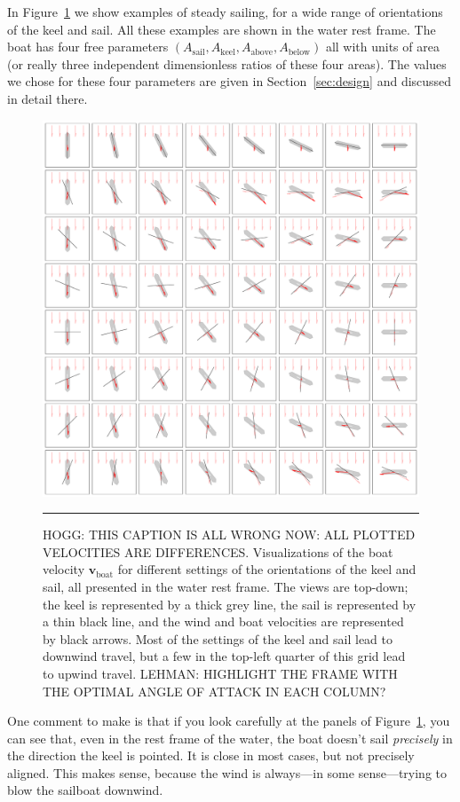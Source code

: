 \documentclass[letterpaper]{article}
\renewcommand{\vec}[1]{\boldsymbol{#1}}
\newcommand{\boat}{\text{boat}}
\newcommand{\sail}{\text{sail}}
\newcommand{\keel}{\text{keel}}
\renewcommand{\above}{\text{above}}
\newcommand{\below}{\text{below}}
\newcommand{\vboat}{\vec{v}_\boat}
\newcommand{\secref}[1]{Section~\ref{#1}}
\newcommand{\figref}[1]{Figure~\ref{#1}}
\newcommand{\figurerule}{\rule[1ex]{\textwidth}{0.2pt}}
\begin{document}
In \figref{fig:steady} we show examples of steady sailing, for a wide range of orientations of the keel and sail.
All these examples are shown in the water rest frame.
The boat has four free parameters $(A_\sail,A_\keel,A_{\above},A_{\below})$ all with units of area (or really three independent dimensionless ratios of these four areas).
The values we chose for these four parameters are given in \secref{sec:design} and discussed in detail there.
\begin{figure}[t!]
  \includegraphics[width=\textwidth]{steady.pdf}
  \caption{HOGG: THIS CAPTION IS ALL WRONG NOW: ALL PLOTTED VELOCITIES ARE DIFFERENCES. Visualizations of the boat velocity $\vboat$ for different settings of the orientations of the keel and sail, all presented in the water rest frame.
  The views are top-down; the keel is represented by a thick grey line, the sail is represented by a thin black line, and the wind and boat velocities are represented by black arrows.
  Most of the settings of the keel and sail lead to downwind travel, but a few in the top-left quarter of this grid lead to upwind travel.
  LEHMAN: HIGHLIGHT THE FRAME WITH THE OPTIMAL ANGLE OF ATTACK IN EACH COLUMN?
  \label{fig:steady}}
  \figurerule
\end{figure}

One comment to make is that if you look carefully at the panels of \figref{fig:steady}, you can see that, even in the rest frame of the water, the boat doesn't sail \emph{precisely} in the direction the keel is pointed.
It is close in most cases, but not precisely aligned.
This makes sense, because the wind is always---in some sense---trying to blow the sailboat downwind.
\end{document}
